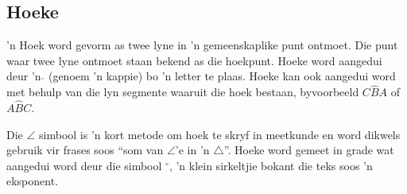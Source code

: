 % 
% 
\subsection*{Hoeke}

’n Hoek word gevorm as twee lyne in ’n gemeenskaplike punt ontmoet. Die punt waar twee lyne ontmoet staan bekend as die hoekpunt. Hoeke word aangedui deur ’n $\hat{}$ (genoem ’n kappie) bo ’n letter te plaas. Hoeke kan ook aangedui word met behulp van die lyn segmente waaruit die hoek bestaan, byvoorbeeld $C\hat{B}A$ of $A\hat{B}C$.

 Die $\angle $ simbool is 'n kort metode om hoek te skryf in meetkunde en word dikwels gebruik vir frases soos ``som van  $\angle$'e in 'n $\triangle$''. Hoeke word gemeet in grade wat aangedui word deur die simbool $^{\circ }$, 'n klein sirkeltjie bokant die teks soos 'n eksponent.\par 


